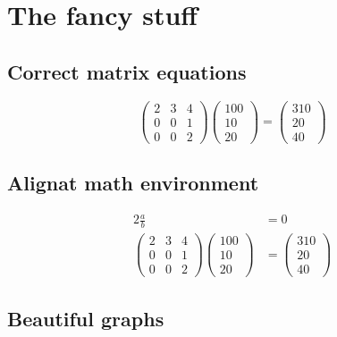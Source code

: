 \documentclass{article}%
\begin{document}
%
\section{The fancy stuff}%
\label{sec:Thefancystuff}%
\subsection{Correct matrix equations}%
\label{subsec:Correctmatrixequations}%
\[%
\begin{pmatrix}%
2&3&4\\%
0&0&1\\%
0&0&2%
\end{pmatrix} \begin{pmatrix}%
100\\%
10\\%
20%
\end{pmatrix} = \begin{pmatrix}%
310\\%
20\\%
40%
\end{pmatrix}%
\]

%
\subsection{Alignat math environment}%
\label{subsec:Alignatmathenvironment}%
\begin{alignat*}{2}%
\frac{a}{b} &= 0 \\%
\begin{pmatrix}%
2&3&4\\%
0&0&1\\%
0&0&2%
\end{pmatrix}%
\begin{pmatrix}%
100\\%
10\\%
20%
\end{pmatrix}%
&=%
\begin{pmatrix}%
310\\%
20\\%
40%
\end{pmatrix}%
\end{alignat*}

%
\subsection{Beautiful graphs}%
\label{subsec:Beautifulgraphs}%
\end{document}
